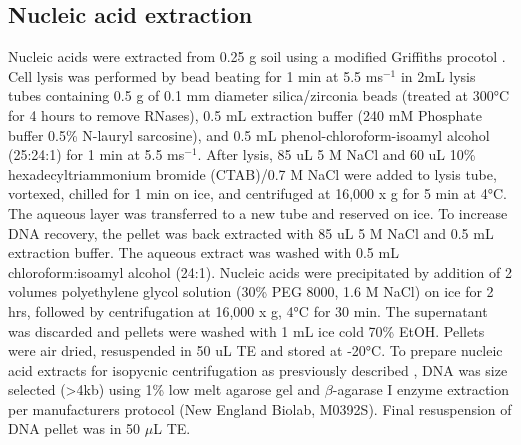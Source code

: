 \subsection{Nucleic acid extraction}
Nucleic acids were extracted from 0.25 g soil using a modified Griffiths
procotol \cite{Griffiths_2000}. Cell lysis was performed by bead beating for
1 min at 5.5 ms$^{-1}$ in 2mL lysis tubes containing 0.5 g of 0.1
mm diameter silica/zirconia beads (treated at 300°C for 4 hours to remove
RNases), 0.5 mL extraction buffer (240 mM Phosphate buffer 0.5\% N-lauryl
sarcosine), and 0.5 mL phenol-chloroform-isoamyl alcohol (25:24:1) for 1 min at
5.5 ms$^{-1}$. After lysis, 85 uL 5 M NaCl and 60 uL 10\%
hexadecyltriammonium bromide (CTAB)/0.7 M NaCl were added to lysis tube,
vortexed, chilled for 1 min on ice, and centrifuged at 16,000 x g for 5 min at
4°C. The aqueous layer was transferred to a new tube and reserved on ice. To
increase DNA recovery, the pellet was back extracted with 85 uL 5 M NaCl and
0.5 mL extraction buffer. The aqueous extract was washed with 0.5 mL
chloroform:isoamyl alcohol (24:1). Nucleic acids were precipitated by addition
of 2 volumes polyethylene glycol solution (30\% PEG 8000, 1.6 M NaCl) on ice
for 2 hrs, followed by centrifugation at 16,000 x g, 4°C for 30 min. The
supernatant was discarded and pellets were washed with 1 mL ice cold 70\% EtOH.
Pellets were air dried, resuspended in 50 uL TE and stored at -20°C. To prepare
nucleic acid extracts for isopycnic centrifugation as presviously described
\cite{Buckley_2007}, DNA was size selected (\textgreater 4kb) using 1\% low
melt agarose gel and $\beta$-agarase I enzyme extraction per manufacturers
protocol (New England Biolab, M0392S).  Final resuspension of DNA pellet was in
50 $\mu$L TE.   



